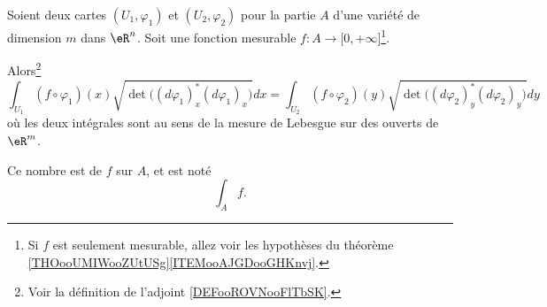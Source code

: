 \begin{propositionDef}     \label{PROPooOAHWooAfxvyv}
	Soient deux cartes \( (U_1,\varphi_1)\) et \( (U_2,\varphi_2)\) pour la partie \( A\) d'une variété de dimension \( m\) dans \( \eR^n\). Soit une fonction mesurable \( f\colon A\to \mathopen[ 0 , +\infty \mathclose]\)\footnote{Si \( f\) est seulement mesurable, allez voir les hypothèses du théorème \ref{THOooUMIWooZUtUSg}\ref{ITEMooAJGDooGHKnvj}.}.

	Alors\footnote{Voir la définition de l'adjoint \ref{DEFooROVNooFlTbSK}.}
	\begin{equation}
		\int_{U_1}(f\circ \varphi_1)(x)\sqrt{ \det\big( (d\varphi_1)_x^*(d\varphi_1)_x \big) }dx=
		\int_{U_2}(f\circ \varphi_2)(y)\sqrt{ \det\big( (d\varphi_2)_y^*(d\varphi_2)_y \big) }dy
	\end{equation}
	où les deux intégrales sont au sens de la mesure de Lebesgue sur des ouverts de \( \eR^m\).

	Ce nombre est  de \( f\) sur \( A\), et est noté
	\begin{equation}
		\int_Af.
	\end{equation}
\end{propositionDef}

